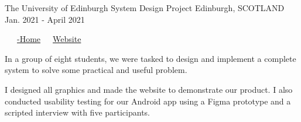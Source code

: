 \begin{cventries}
  \cventry
    {The University of Edinburgh} %
    {System Design Project} %
    {Edinburgh, SCOTLAND} %
    {Jan. 2021 - April 2021} %
    {
      \color{awesome}     \color{graytext}\ \ \ \href{https://github.com/DeliverED-Home}{\faGithub\acvHeaderIconSep\@DeliverED-Home}\ \ \ \href{https://DeliverED-Home.github.io/DeliverED-Site}{\faGlobe\acvHeaderIconSep\@Product Website}
      \vspace{1.6em}
      \begin{cvitems} %
        \item In a group of eight students, we were tasked to design and implement a complete system to solve some practical and useful problem.
        \item I designed all graphics and made the website to demonstrate our product. I also conducted usability testing for our Android app using a Figma prototype and a scripted interview with five participants.
      \end{cvitems}
    }
    

\end{cventries}
